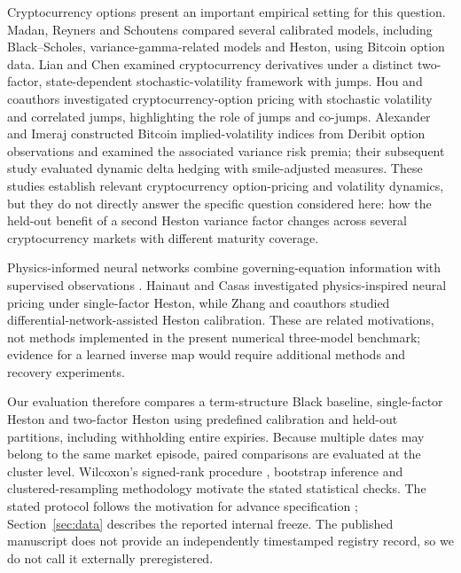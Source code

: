 \documentclass[runningheads]{llncs}
\begin{document}
Cryptocurrency options present an important empirical setting for this
question. Madan, Reyners and Schoutens \cite{ref:madan} compared several
calibrated models, including Black--Scholes, variance-gamma-related
models and Heston, using Bitcoin option data. Lian and Chen
\cite{ref:lian} examined cryptocurrency derivatives under a distinct
two-factor, state-dependent stochastic-volatility framework with jumps.
Hou and coauthors \cite{ref:hou} investigated cryptocurrency-option
pricing with stochastic volatility and correlated jumps, highlighting
the role of jumps and co-jumps. Alexander and Imeraj \cite{ref:ai2021}
constructed Bitcoin implied-volatility indices from Deribit option
observations and examined the associated variance risk premia; their
subsequent study \cite{ref:ai2023} evaluated dynamic delta hedging with
smile-adjusted measures. These studies establish relevant cryptocurrency
option-pricing and volatility dynamics, but they do not directly answer
the specific question considered here: how the held-out benefit of a
second Heston variance factor changes across several cryptocurrency
markets with different maturity coverage.

Physics-informed neural networks combine governing-equation information
with supervised observations \cite{ref:raissi}. Hainaut and Casas
\cite{ref:hainaut} investigated physics-inspired neural pricing under
single-factor Heston, while Zhang and coauthors \cite{ref:zhang} studied
differential-network-assisted Heston calibration. These are related
motivations, not methods implemented in the present numerical
three-model benchmark; evidence for a learned inverse map would require
additional methods and recovery experiments.

Our evaluation therefore compares a term-structure Black baseline,
single-factor Heston and two-factor Heston using predefined calibration
and held-out partitions, including withholding entire expiries. Because
multiple dates may belong to the same market episode, paired comparisons
are evaluated at the cluster level. Wilcoxon's signed-rank procedure
\cite{ref:wilcoxon}, bootstrap inference \cite{ref:efron} and
clustered-resampling methodology \cite{ref:cameron} motivate the stated
statistical checks. The stated protocol follows the motivation for
advance specification \cite{ref:nosek}; Section~\ref{sec:data} describes
the reported internal freeze. The published manuscript does not provide
an independently timestamped registry record, so we do not call it
externally preregistered.

\end{document}
